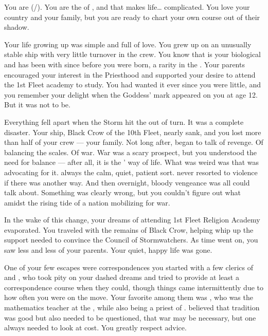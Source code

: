 \documentclass[char]{GL2020}
\begin{document}
\name{\cWarlordDaughter{}}

You are \cWarlordDaughter{\full} (\cWarlordDaughter{\they}/\cWarlordDaughter{\them}). You are the \cWarlordDaughter{\offspring} of \cLoud{\full}, and that makes life\ldots{} complicated. You love your country and your family, but you are ready to chart your own course out of their shadow.

Your life growing up was simple and full of love. You grew up on an unusually stable ship with very little turnover in the crew. You know that \cLoud{} is your biological \cLoud{\parent} and has been with \cQuiet{\full} since before you were born, a rarity in the \pShip{}. Your parents encouraged your interest in the Priesthood and supported your desire to attend the 1st Fleet academy to study. You had wanted it ever since you were little, and you remember your delight when the Goddess’ mark appeared on you at age 12. But it was not to be.

Everything fell apart when the Storm hit the \pShip{} out of turn. It was a complete disaster. Your ship, Black Crow of the 10th Fleet, nearly sank, and you lost more than half of your crew — your family. Not long after, \cLoud{} began to talk of revenge. Of balancing the scales. Of war. War was a scary prospect, but you understood the need for balance — after all, it is the \pShippies{}’ way of life. What was weird was that \cLoud{} was advocating for it. \cLoud{\They} \cLoud{\were} always the calm, quiet, patient sort. \cLoud{\They} never resorted to violence if there was another way. And then overnight, bloody vengeance was all \cLoud{\they} could talk about. Something was clearly wrong, but you couldn't figure out what amidst the rising tide of a nation mobilizing for war. 

In the wake of this change, your dreams of attending 1st Fleet Religion Academy evaporated. You traveled with the remains of Black Crow, helping \cLoud{} whip up the support \cLoud{\they} needed to convince the Council of Stormwatchers. As time went on, you saw less and less of your parents. Your quiet, happy life was gone.  

One of your few escapes were correspondences you started with a few clerics of \cEbb{} and \cFlow{}, who took pity on your dashed dreams and tried to provide at least a correspondence course when they could, though things came intermittently due to how often you were on the move. Your favorite among them was \cFlowPriest{\full}, who was the mathematics teacher at the \pSchool{}, while also being a priest of \cFlow{}. \cFlowPriest{\They} believed that tradition was good but also needed to be questioned, that war may be necessary, but one always needed to look at cost. You greatly respect \cFlowPriest{\their} advice. 
\end{document}

